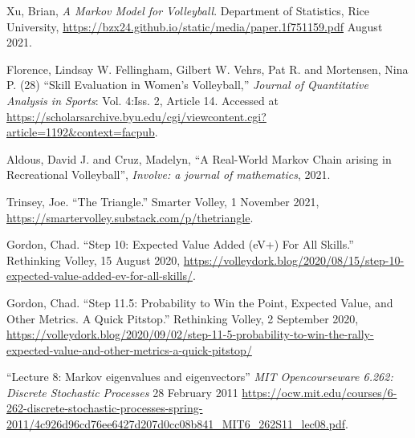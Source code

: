 \documentclass{IOS-Book-Article}
\begin{document}
\begin{thebibliography}{99}

Xu, Brian, \textit{A Markov Model for Volleyball}. Department of Statistics, Rice University, \url{https://bzx24.github.io/static/media/paper.1f751159.pdf} August 2021.

Florence, Lindsay W. Fellingham, Gilbert W. Vehrs, Pat R. and Mortensen, Nina P. (28) ``Skill
Evaluation in Women's Volleyball,'' \textit{Journal of Quantitative Analysis in Sports}: Vol. 4:Iss.
2, Article 14. Accessed at 
\url{https://scholarsarchive.byu.edu/cgi/viewcontent.cgi?article=1192&context=facpub}.

Aldous, David J. and Cruz, Madelyn, ``A Real-World Markov Chain arising in Recreational Volleyball'', \textit{Involve: a journal of mathematics}, 2021.

Trinsey, Joe. ``The Triangle.'' Smarter Volley, 1 November 2021, 
\url{https://smartervolley.substack.com/p/thetriangle}.

Gordon, Chad. ``Step 10: Expected Value Added (eV+) For All Skills.'' Rethinking Volley, 15 August 
2020, 
\url{https://volleydork.blog/2020/08/15/step-10-expected-value-added-ev-for-all-skills/}.

Gordon, Chad. ``Step 11.5: Probability to Win the Point, Expected Value, and Other Metrics. A Quick Pitstop.'' Rethinking Volley, 2 September
2020, 
\url{https://volleydork.blog/2020/09/02/step-11-5-probability-to-win-the-rally-expected-value-and-other-metrics-a-quick-pitstop/}

``Lecture 8: Markov eigenvalues and eigenvectors'' \textit{MIT Opencourseware 6.262: Discrete 
Stochastic Processes} 28 February 2011
\url{https://ocw.mit.edu/courses/6-262-discrete-stochastic-processes-spring-2011/4c926d96cd76ee6427d207d0cc08b841_MIT6_262S11_lec08.pdf}.

\end{thebibliography}
\end{document}
